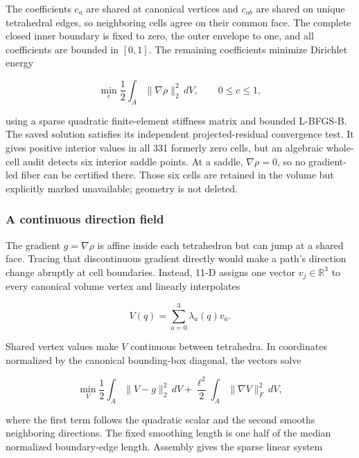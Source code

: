 \documentclass[11pt]{article}
\begin{document}
The coefficients $c_a$ are shared at canonical vertices and $c_{ab}$ are shared on
unique tetrahedral edges, so neighboring cells agree on their common face. The complete
closed inner boundary is fixed to zero, the outer envelope to one, and all coefficients
are bounded in $[0,1]$. The remaining coefficients minimize Dirichlet energy

\begin{equation}
  \min_c\frac12\int_A\|\nabla\rho\|_2^2\,dV,
  \qquad 0\le c\le1,
  \label{eq:rho-energy}
\end{equation}

using a sparse quadratic finite-element stiffness matrix and bounded L-BFGS-B. The saved
solution satisfies its independent projected-residual convergence test. It gives
positive interior values in all 331 formerly zero cells, but an algebraic whole-cell
audit detects six interior saddle points. At a saddle, $\nabla\rho=0$, so no gradient-led
fiber can be certified there. Those six cells are retained in the volume but explicitly
marked unavailable; geometry is not deleted.

\subsubsection{A continuous direction field}

The gradient $g=\nabla\rho$ is affine inside each tetrahedron but can jump at a shared
face. Tracing that discontinuous gradient directly would make a path's direction change
abruptly at cell boundaries. Instead, 11-D assigns one vector $v_j\in\mathbb{R}^3$ to
every canonical volume vertex and linearly interpolates

\begin{equation}
  V(q)=\sum_{a=0}^{3}\lambda_a(q)v_a.
\end{equation}

Shared vertex values make $V$ continuous between tetrahedra. In coordinates normalized
by the canonical bounding-box diagonal, the vectors solve

\begin{equation}
  \min_V\frac12\int_A\|V-g\|_2^2\,dV
  +\frac{\ell^2}{2}\int_A\|\nabla V\|_F^2\,dV,
  \label{eq:direction-energy}
\end{equation}

where the first term follows the quadratic scalar and the second smooths neighboring
directions. The fixed smoothing length is one half of the median normalized boundary-edge
length. Assembly gives the sparse linear system
\end{document}
